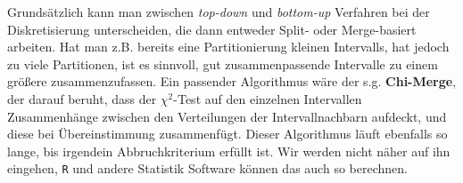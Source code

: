 Grundsätzlich kann man zwischen \textit{top-down} und \textit{bottom-up} Verfahren
bei der Diskretisierung unterscheiden, die dann entweder Split- oder Merge-basiert
arbeiten. Hat man z.B. bereits eine Partitionierung kleinen Intervalls, hat jedoch
zu viele Partitionen, ist es sinnvoll, gut zusammenpassende Intervalle zu einem
größere zusammenzufassen. Ein passender Algorithmus wäre der s.g. \textbf{Chi-Merge},
der darauf beruht, dass der \(\chi^2\)-Test auf den einzelnen Intervallen 
Zusammenhänge zwischen den Verteilungen der Intervallnachbarn aufdeckt, und diese
bei Übereinstimmung zusammenfügt. Dieser Algorithmus läuft ebenfalls so lange,
bis irgendein Abbruchkriterium erfüllt ist. Wir werden nicht näher auf ihn
eingehen, \texttt{R} und andere Statistik Software können das auch so berechnen.
